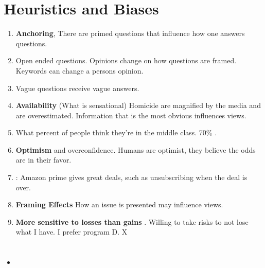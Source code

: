 \documentclass{article}
\begin{document}
\section*{Heuristics and Biases}
\begin{enumerate}
    \item \textbf{Anchoring}, There are primed questions that influence how one answers questions. 
    \item Open ended questions. Opinions change on how questions are framed. Keywords can change a persons opinion. 
    \item Vague questions receive vague answers. 
    \item \textbf{Availability }(What is sensational) Homicide are magnified by the media and are overestimated. Information that is the most obvious influences views. 
    \item What percent of people think they're in the middle class. 70\% . 
    \item \textbf{Optimism } and overconfidence. Humans are optimist, they believe the odds are in their favor. 
    \item {}: Amazon prime gives great deals, such as unsubscribing when the deal is over. 
    \item \textbf{Framing Effects } How an issue is presented may influence views. 
    \item \textbf{ More sensitive to losses than gains} . Willing to take risks to not lose what I have. I prefer program D. X
\end{enumerate}
\section*{}
\begin{itemize}
    \item 
\end{itemize}
\end{document}
